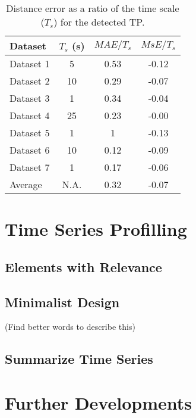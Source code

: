 \begin{table}
	\begin{center}
        \begin{tabular}{lccc}
            \toprule
			Dataset & $T_s$ (s) & $MAE/T_s$ & $MsE/T_s$ \\
			\toprule
			Dataset 1 & 5 & 0.53 & -0.12 \\
			Dataset 2 & 10 & 0.29 & -0.07 \\
			Dataset 3 & 1 & 0.34 & -0.04 \\
			Dataset 4 & 25 & 0.23 & -0.00 \\
			Dataset 5 & 1 & 1 & -0.13 \\
			Dataset 6 & 10 & 0.12 & -0.09 \\
			Dataset 7 & 1 & 0.17 & -0.06 \\
			\midrule
			Average & N.A. & 0.32 & -0.07 \\
			\bottomrule
		\end{tabular}
	\end{center}
	\caption{Distance error as a ratio of the time scale ($T_s$) for the detected TP.}
	\label{tab:overall_cpd_dist}
\end{table}



\section{Time Series Profilling}

\subsection{Elements with Relevance}
\subsection{Minimalist Design}
(Find better words to describe this)
\subsection{Summarize Time Series}

\section{Further Developments}
